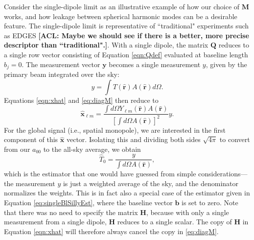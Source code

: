 \documentclass[twolcolumn,apj,iop,numberedappendix]{emulateapj}
\newcommand{\Hmat}{\mathbf{H}}
\newcommand{\M}{\mathbf{M}}
\newcommand{\acl}[1]{{\color{red} \textbf{[ACL:  #1]}}}
\begin{document}
Consider the single-dipole limit as an illustrative example of how our choice of $\M$ works, and how leakage between spherical harmonic modes can be a desirable feature. The single-dipole limit is representative of ``traditional" experiments such as EDGES \acl{Maybe we should see if there is a better, more precise descriptor than ``traditional".}. With a single dipole, the matrix $\mathbf{Q}$ reduces to a single row vector consisting of Equation \eqref{eqn:Qdef} evaluated at baseline length $b_j=0$. The measurement vector $\mathbf{y}$ becomes a single measurement $y$, given by the primary beam integrated over the sky:
\begin{equation}
y = \int T(\mathbf{\hat{r}}) A(\mathbf{\hat{r}}) d\Omega.
\end{equation}
Equations \eqref{eqn:xhat} and \eqref{eq:diagM} then reduce to
\begin{equation}
\mathbf{\hat{x}}_{\ell m} = \frac{\int d\Omega Y_{\ell m} (\mathbf{\hat{r}}) A(\mathbf{\hat{r}})}{\left[ \int d\Omega A(\mathbf{\hat{r}}) \right]^2} y.
\end{equation}
For the global signal (i.e., spatial monopole), we are interested in the first component of this $\mathbf{\hat{x}}$ vector. Isolating this and dividing both sides $\sqrt{4\pi}$ to convert from our $a_{00}$ to the all-sky average, we obtain
\begin{equation}
\label{eq:singleElementExtraction}
\widehat{T}_0 = \frac{y}{ \int d\Omega A(\mathbf{\hat{r}}) },
\end{equation}
which is the estimator that one would have guessed from simple considerations---the measurement $y$ is just a weighted average of the sky, and the denominator normalizes the weights. This is in fact also a special case of the estimator given in Equation \eqref{eq:singleBlSillyEst}, where the baseline vector $\mathbf{b}$ is set to zero. Note that there was no need to specify the matrix $\Hmat$, because with only a single measurement from a single dipole, $\Hmat$ reduces to a single scalar. The copy of $\Hmat$ in Equation \eqref{eqn:xhat} will therefore always cancel the copy in \eqref{eq:diagM}.
%
\end{document}
